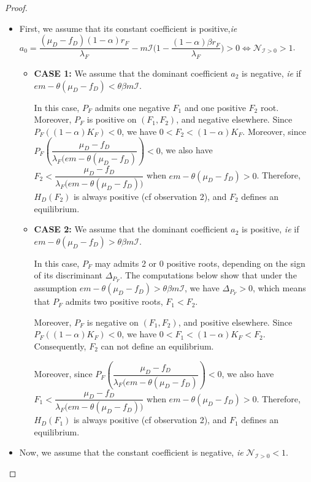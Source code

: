 \documentclass{article}
\newcommand{\lfw}{\lambda_{F}}
\newcommand{\lfw}{\lambda_{F}}
\newcommand{\cI}{\mathcal{I}}
\begin{document}
\begin{proof}
\begin{itemize}
\item First, we assume that its constant coefficient is positive,\textit{ie}$a_0 = \dfrac{(\mu_D - f_D)(1-\alpha) r_F}{\lfw} - m\cI\Big(1 - \dfrac{(1-\alpha)\beta r_F}{\lfw} \Big) > 0 \Leftrightarrow \mathcal{N}_{\cI > 0} > 1$.

\begin{itemize}
\item \textbf{CASE 1: }We assume that the dominant coefficient $a_2$ is negative, \textit{ie} if $ em - \theta (\mu_D - f_D) < \theta \beta m \cI$.

In this case, $P_F$ admits one negative $F_1$ and one positive $F_2$ root. Moreover, $P_F$ is positive on $(F_1, F_2)$, and negative elsewhere. Since $P_F((1-\alpha) K_F) < 0$, we have $0 < F_2 < (1-\alpha) K_F$. Moreover, since $P_F\left(\dfrac{\mu_D - f_D}{\lfw \Big(e m - \theta (\mu_D - f_D)} \right) < 0$, we also have $F_2 < \dfrac{\mu_D - f_D}{\lfw \Big(e m - \theta (\mu_D - f_D)\Big)}$ when $e m - \theta (\mu_D - f_D) > 0$. Therefore, $H_D(F_2)$ is always positive (cf observation 2), and $F_2$ defines an equilibrium.

\medskip

\item \textbf{CASE 2: } We assume that the dominant coefficient $a_2$ is positive, \textit{ie} if $em - \theta (\mu_D - f_D) > \theta \beta m \cI$.

In this case, $P_F$ may admits 2 or 0 positive roots, depending on the sign of its discriminant $\Delta_{P_F}$. The computations below show that under the assumption $em - \theta (\mu_D - f_D) > \theta \beta m \cI$, we have $\Delta_{P_F} > 0$, which means that $P_F$ admits two positive roots, $F_1 < F_2$. 

Moreover, $P_F$ is negative on $(F_1, F_2)$, and positive elsewhere. Since $P_F((1-\alpha) K_F) < 0$, we have $0 < F_1 < (1-\alpha) K_F < F_2$. Consequently, $F_2$ can not define an equilibrium.

Moreover, since $P_F\left(\dfrac{\mu_D - f_D}{\lfw \Big(e m - \theta (\mu_D - f_D)} \right) < 0$, we also have $F_1 < \dfrac{\mu_D - f_D}{\lfw \Big(e m - \theta (\mu_D - f_D)\Big)}$ when $e m - \theta (\mu_D - f_D) > 0$. Therefore, $H_D(F_1)$ is always positive (cf observation 2), and $F_1$ defines an equilibrium.
\end{itemize}

\item Now, we assume that the constant coefficient is negative, \textit{ie} $\mathcal{N}_{\cI > 0} < 1$.


\end{itemize}
\end{proof}
\end{document}
